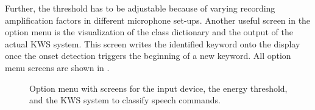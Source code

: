 Further, the threshold has to be adjustable because of varying recording amplification factors in different microphone set-ups.
Another useful screen in the option menu is the visualization of the class dictionary and the output of the actual KWS system.
This screen writes the identified keyword onto the display once the onset detection triggers the beginning of a new keyword.
All option menu screens are shown in .
\begin{figure}[!ht]
  \centering
  \quad
  \quad
  \caption{Option menu with screens for the input device, the energy threshold, and the KWS system to classify speech commands.}
  \label{fig:game_design_menu_options}
\end{figure}
\FloatBarrier
\noindent


